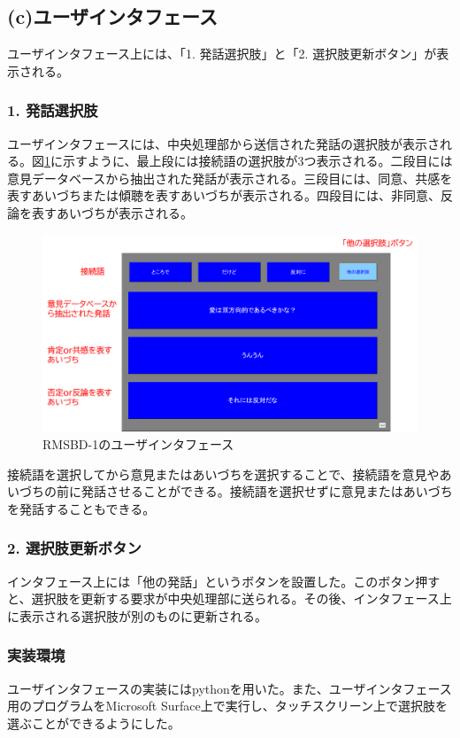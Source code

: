 \documentclass[11pt, a4paper]{jreport} %
\begin{document}
\subsection*{(c)ユーザインタフェース}
ユーザインタフェース上には、「1. 発話選択肢」と「2. 選択肢更新ボタン」が表示される。
\subsubsection*{1. 発話選択肢}
ユーザインタフェースには、中央処理部から送信された発話の選択肢が表示される。図\ref{fig:inter1}に示すように、最上段には接続語の選択肢が3つ表示される。二段目には意見データベースから抽出された発話が表示される。三段目には、同意、共感を表すあいづちまたは傾聴を表すあいづちが表示される。四段目には、非同意、反論を表すあいづちが表示される。

\begin{figure}[htbp]
\begin{center}
\includegraphics[width=120mm]{images/inter1.png}
\caption{RMSBD-1のユーザインタフェース}
\label{fig:inter1}
\end{center}
\end{figure}


接続語を選択してから意見またはあいづちを選択することで、接続語を意見やあいづちの前に発話させることができる。接続語を選択せずに意見またはあいづちを発話することもできる。

\subsubsection*{2. 選択肢更新ボタン}
インタフェース上には「他の発話」というボタンを設置した。このボタン押すと、選択肢を更新する要求が中央処理部に送られる。その後、インタフェース上に表示される選択肢が別のものに更新される。

\subsubsection*{実装環境}
ユーザインタフェースの実装にはpythonを用いた。また、ユーザインタフェース用のプログラムをMicrosoft Surface上で実行し、タッチスクリーン上で選択肢を選ぶことができるようにした。%
\end{document}
